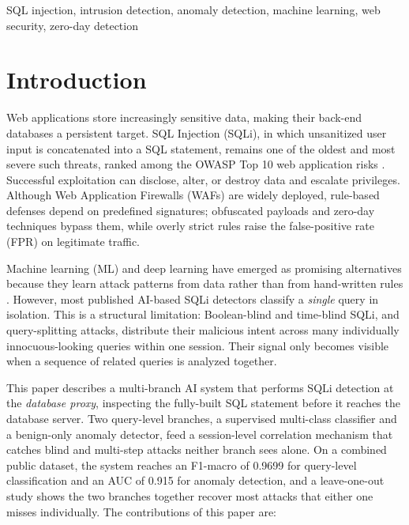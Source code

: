 \documentclass[conference]{IEEEtran}
\begin{document}
\begin{IEEEkeywords}
SQL injection, intrusion detection, anomaly detection, machine learning, web security, zero-day detection
\end{IEEEkeywords}

\section{Introduction}
Web applications store increasingly sensitive data, making their back-end databases a persistent target. SQL Injection (SQLi), in which unsanitized user input is concatenated into a SQL statement, remains one of the oldest and most severe such threats, ranked among the OWASP Top 10 web application risks \cite{b12}. Successful exploitation can disclose, alter, or destroy data and escalate privileges. Although Web Application Firewalls (WAFs) are widely deployed, rule-based defenses depend on predefined signatures; obfuscated payloads and zero-day techniques bypass them, while overly strict rules raise the false-positive rate (FPR) on legitimate traffic.

Machine learning (ML) and deep learning have emerged as promising alternatives because they learn attack patterns from data rather than from hand-written rules \cite{b1,b2,b3}. However, most published AI-based SQLi detectors classify a \emph{single} query in isolation. This is a structural limitation: Boolean-blind and time-blind SQLi, and query-splitting attacks, distribute their malicious intent across many individually innocuous-looking queries within one session. Their signal only becomes visible when a sequence of related queries is analyzed together.

This paper describes a multi-branch AI system that performs SQLi detection at the \emph{database proxy}, inspecting the fully-built SQL statement before it reaches the database server. Two query-level branches, a supervised multi-class classifier and a benign-only anomaly detector, feed a session-level correlation mechanism that catches blind and multi-step attacks neither branch sees alone. On a combined public dataset, the system reaches an F1-macro of 0.9699 for query-level classification and an AUC of 0.915 for anomaly detection, and a leave-one-out study shows the two branches together recover most attacks that either one misses individually. The contributions of this paper are:
\end{document}
